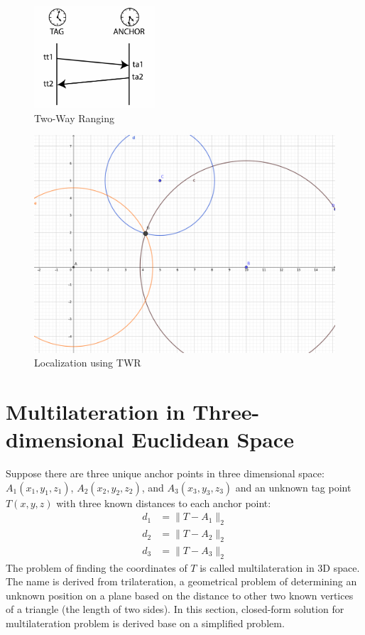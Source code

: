 \documentclass[\main/thesis.tex]{subfiles}
\begin{document}
\begin{figure}[H]
    \centering
    \includegraphics[width=0.4\textwidth]{twr_protocol.png}
    \caption{Two-Way Ranging}
    \label{fig:twr_anchor_and_tag}
\end{figure}

\begin{figure}[H]
    \centering
    \includegraphics[width=1\textwidth]{twr.png}
    \caption{Localization using TWR}
    \label{fig:twr_trilateration}
\end{figure}

\section{Multilateration in Three-dimensional Euclidean Space}
\label{sec:localization_using_multilateration}

Suppose there are three unique anchor points in three dimensional space: $A_1(x_1, y_1,z_1)$, $A_2(x_2, y_2,z_2)$,
and $A_3(x_3, y_3,z_3)$ and an unknown tag point $T(x,y,z)$ with three known distances to each anchor point:
\begin{equation}
    \begin{split}
        d_1 &= \| T - A_1 \|_2 \\
        d_2 &= \| T - A_2 \|_2 \\
        d_3 &= \| T - A_3 \|_2
    \end{split}
\end{equation}
The problem of finding the coordinates of $T$ is called multilateration in 3D space. The name is derived from trilateration, a  geometrical problem of determining an unknown position on a plane based on the distance to other two known vertices of a triangle (the length of two sides). In this section, closed-form solution for multilateration problem is derived base on a simplified problem.
\end{document}
